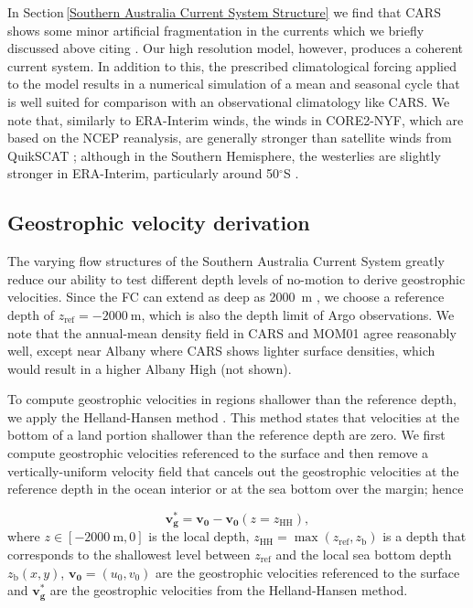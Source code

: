 \documentclass[preprint,3p,review,12pt]{elsarticle}
\renewcommand{\Vec}[1]{\mathbf{#1}}
\newcommand{\dg}{$^{\circ}$}
\newcommand{\sub}[1]{_{\text{#1}}}
\begin{document}
In Section\,\ref{Southern Australia Current System Structure} we find that CARS shows some minor artificial fragmentation in the currents which we briefly discussed above citing \citet{Ridgway2002}. Our high resolution model, however, produces a coherent current system. In addition to this, the prescribed climatological forcing applied to the model results in a numerical simulation of a mean and seasonal cycle that is well suited for comparison with an observational climatology like CARS.
We note that, similarly to ERA-Interim winds, the winds in CORE2-NYF, which are based on the NCEP reanalysis, are generally stronger than satellite winds from QuikSCAT \citep{Large2009}; although in the Southern Hemisphere, the westerlies are slightly stronger in ERA-Interim, particularly around 50\dg S \citep{Chaudhuri2013}.

\subsection{Geostrophic velocity derivation} \label{Geostrophic velocity derivation}
The varying flow structures of the Southern Australia Current System greatly reduce our ability to test different depth levels of no-motion to derive geostrophic velocities. Since the FC can extend as deep as \SI{2000}{\meter} \citep{Middleton2002}, we choose a reference depth of $z\sub{ref} = \SI{-2000}{\meter}$, which is also the depth limit of Argo observations. We note that the annual-mean density field in CARS and MOM01 agree reasonably well, except near Albany where CARS shows lighter surface densities, which would result in a higher Albany High (not shown).

To compute geostrophic velocities in regions shallower than the reference depth, we apply the Helland-Hansen method \citep{Helland-Hansen1934,Fomin1964}. This method states that velocities at the bottom of a land portion shallower than the reference depth are zero. We first compute geostrophic velocities referenced to the surface and then remove a vertically-uniform velocity field that cancels out the geostrophic velocities at the reference depth in the ocean interior or at the sea bottom over the margin; hence

\begin{equation}
\Vec{v\sub{g}^{*}} = \Vec{v\sub{0}} - \Vec{v\sub{0}}(z=z\sub{HH}),
\end{equation}
%
where $z \in [\SI{-2000}{\meter}, 0]$ is the local depth, $z\sub{HH} = \max(z\sub{ref},z\sub{b})$ is a depth that corresponds to the shallowest level between $z\sub{ref}$ and the local sea bottom depth $z\sub{b}(x,y)$, $\Vec{v\sub{0}}=(u\sub{0},v\sub{0})$ are the geostrophic velocities referenced to the surface and $\Vec{v\sub{g}^{*}}$ are the geostrophic velocities from the Helland-Hansen method.
\end{document}
